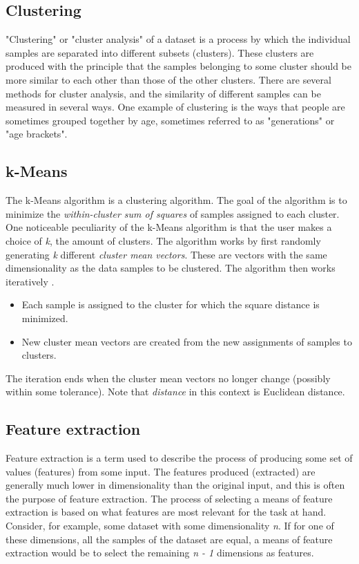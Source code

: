 \documentclass{article}
\begin{document}
\subsection{Clustering}
"Clustering" or "cluster analysis" of a dataset is a process by which the individual samples are separated into different subsets (clusters). These clusters are produced with the principle that the samples belonging to some cluster should be more similar to each other than those of the other clusters. There are several methods for cluster analysis, and the similarity of different samples can be measured in several ways. One example of clustering is the ways that people are sometimes grouped together by age, sometimes referred to as "generations" or "age brackets".

\subsection{k-Means}
The k-Means algorithm is a clustering algorithm. The goal of the algorithm is to minimize the \textit{within-cluster sum of squares} of samples assigned to each cluster. One noticeable peculiarity of the k-Means algorithm is that the user makes a choice of \textit{k}, the amount of clusters. The algorithm works by first randomly generating \textit{k} different \textit{cluster mean vectors}. These are vectors with the same dimensionality as the data samples to be clustered. The algorithm then works iteratively \citep[p258-260]{PractStats}.
\begin{itemize}
    \item Each sample is assigned to the cluster for which the square distance is minimized.
    \item New cluster mean vectors are created from the new assignments of samples to clusters.
\end{itemize}
The iteration ends when the cluster mean vectors no longer change (possibly within some tolerance). Note that \textit{distance} in this context is Euclidean distance.

\subsection{Feature extraction}
Feature extraction is a term used to describe the process of producing some set of values (features) from some input. The features produced (extracted) are generally much lower in dimensionality than the original input, and this is often the purpose of feature extraction. The process of selecting a means of feature extraction is based on what features are most relevant for the task at hand. Consider, for example, some dataset with some dimensionality \textit{n}. If for one of these dimensions, all the samples of the dataset are equal, a means of feature extraction would be to select the remaining \textit{n - 1} dimensions as features. 
\end{document}

